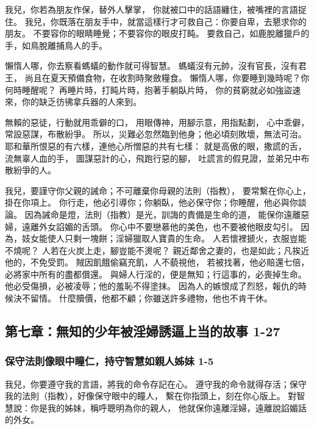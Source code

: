 我兒，你若為朋友作保，替外人擊掌，
你就被口中的話語纏住，被嘴裡的言語捉住。
我兒，你既落在朋友手中，就當這樣行才可救自己：你要自卑，去懇求你的朋友。
不要容你的眼睛睡覺；不要容你的眼皮打盹。
要救自己，如鹿脫離獵戶的手，如鳥脫離捕鳥人的手。

懶惰人哪，你去察看螞蟻的動作就可得智慧。
螞蟻沒有元帥，沒有官長，沒有君王，
尚且在夏天預備食物，在收割時聚斂糧食。
懶惰人哪，你要睡到幾時呢？你何時睡醒呢？
再睡片時，打盹片時，抱著手躺臥片時，
你的貧窮就必如強盜速來，你的缺乏彷彿拿兵器的人來到。

無賴的惡徒，行動就用乖僻的口，
用眼傳神，用腳示意，用指點劃，
心中乖僻，常設惡謀，布散紛爭。
所以，災難必忽然臨到他身；他必頃刻敗壞，無法可治。
耶和華所恨惡的有六樣，連他心所憎惡的共有七樣：
就是高傲的眼，撒謊的舌，流無辜人血的手，
圖謀惡計的心，飛跑行惡的腳，
吐謊言的假見證，並弟兄中布散紛爭的人。

我兒，要謹守你父親的誡命；不可離棄你母親的法則（指教），
要常繫在你心上，掛在你項上。
你行走，他必引導你；你躺臥，他必保守你；你睡醒，他必與你談論。
因為誡命是燈，法則（指教）是光，訓誨的責備是生命的道，
能保你遠離惡婦，遠離外女諂媚的舌頭。
你心中不要戀慕他的美色，也不要被他眼皮勾引。
因為，妓女能使人只剩一塊餅；淫婦獵取人寶貴的生命。
人若懷裡搋火，衣服豈能不燒呢？
人若在火炭上走，腳豈能不燙呢？
親近鄰舍之妻的，也是如此；凡挨近他的，不免受罰。
賊因飢餓偷竊充飢，人不藐視他，
若被找著，他必賠還七倍，必將家中所有的盡都償還。
與婦人行淫的，便是無知；行這事的，必喪掉生命。
他必受傷損，必被凌辱；他的羞恥不得塗抹。
因為人的嫉恨成了烈怒，報仇的時候決不留情。
什麼贖價，他都不顧；你雖送許多禮物，他也不肯干休。



\subsection{第七章：無知的少年被淫婦誘逼上当的故事 1-27}

\subsubsection{保守法則像眼中瞳仁，持守智慧如親人姊妹 1-5}
我兒，你要遵守我的言語，將我的命令存記在心。
遵守我的命令就得存活；保守我的法則（指教），好像保守眼中的瞳人，
繫在你指頭上，刻在你心版上。
對智慧說：你是我的姊妹，稱呼聰明為你的親人，
他就保你遠離淫婦，遠離說諂媚話的外女。

